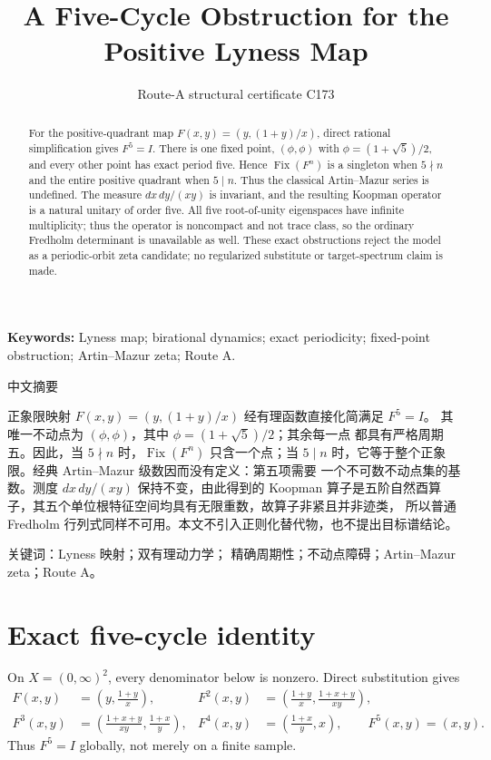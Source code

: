 \documentclass[10pt]{article}
\title{\vspace{-1.7em}A Five-Cycle Obstruction for the Positive Lyness Map}
\author{Route-A structural certificate C173}
\date{}
\begin{document}
\maketitle
\begin{abstract}
For the positive-quadrant map
$F(x,y)=(y,(1+y)/x)$, direct rational simplification gives $F^5=I$.
There is one fixed point, $(\phi,\phi)$ with
$\phi=(1+\sqrt5)/2$, and every other point has exact period five.  Hence
$\operatorname{Fix}(F^n)$ is a singleton when $5\nmid n$ and the entire
positive quadrant when $5\mid n$.  Thus the classical Artin--Mazur series
is undefined.  The measure $dx\,dy/(xy)$ is invariant, and the resulting
Koopman operator is a natural unitary of order five.  All five root-of-unity
eigenspaces have infinite multiplicity; thus the operator is noncompact and
not trace class, so the ordinary Fredholm determinant is unavailable as
well.  These exact obstructions reject the model as a periodic-orbit zeta
candidate; no regularized substitute or target-spectrum claim is made.
\end{abstract}
\noindent\textbf{Keywords:} Lyness map; birational dynamics; exact
periodicity; fixed-point obstruction; Artin--Mazur zeta; Route A.

\begin{otherlanguage}{chinese-simplified}
\begin{center}{\large 中文摘要}\end{center}
正象限映射 $F(x,y)=(y,(1+y)/x)$ 经有理函数直接化简满足 $F^5=I$。
其唯一不动点为 $(\phi,\phi)$，其中 $\phi=(1+\sqrt5)/2$；其余每一点
都具有严格周期五。因此，当 $5\nmid n$ 时，$\operatorname{Fix}(F^n)$
只含一个点；当 $5\mid n$ 时，它等于整个正象限。经典
\foreignlanguage{english}{Artin--Mazur} 级数因而没有定义：第五项需要
一个不可数不动点集的基数。测度 $dx\,dy/(xy)$ 保持不变，由此得到的
\foreignlanguage{english}{Koopman} 算子是五阶自然酉算子，其五个单位根特征空间均具有无限重数，故算子非紧且并非迹类，
所以普通 \foreignlanguage{english}{Fredholm} 行列式同样不可用。本文不引入正则化替代物，也不提出目标谱结论。

\noindent 关键词：\foreignlanguage{english}{Lyness} 映射；双有理动力学；
精确周期性；不动点障碍；\foreignlanguage{english}{Artin--Mazur zeta}；\foreignlanguage{english}{Route A}。
\end{otherlanguage}

\section{Exact five-cycle identity}
On $X=(0,\infty)^2$, every denominator below is nonzero.  Direct substitution
gives
\begin{align*}
F(x,y)&=\left(y,\frac{1+y}{x}\right),&
F^2(x,y)&=\left(\frac{1+y}{x},\frac{1+x+y}{xy}\right),\\
F^3(x,y)&=\left(\frac{1+x+y}{xy},\frac{1+x}{y}\right),&
F^4(x,y)&=\left(\frac{1+x}{y},x\right),\qquad F^5(x,y)=(x,y).
\end{align*}
Thus $F^5=I$ globally, not merely on a finite sample.
\end{document}
